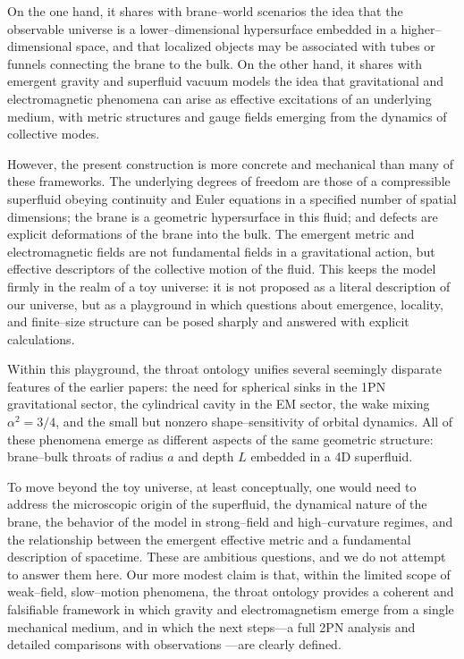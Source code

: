 \documentclass[12pt]{article}
\begin{document}
On the one hand, it shares with brane--world scenarios the idea that the
observable universe is a lower--dimensional hypersurface embedded in a
higher--dimensional space, and that localized objects may be associated with
tubes or funnels connecting the brane to the bulk.  On the other hand, it
shares with emergent gravity and superfluid vacuum models the idea that
gravitational and electromagnetic phenomena can arise as effective
excitations of an underlying medium, with metric structures and gauge fields
emerging from the dynamics of collective modes.

However, the present construction is more concrete and mechanical than many
of these frameworks.  The underlying degrees of freedom are those of a
compressible superfluid obeying continuity and Euler equations in a
specified number of spatial dimensions; the brane is a geometric hypersurface
in this fluid; and defects are explicit deformations of the brane into the
bulk.  The emergent metric and electromagnetic fields are not fundamental
fields in a gravitational action, but effective descriptors of the
collective motion of the fluid.  This keeps the model firmly in the realm
of a toy universe: it is not proposed as a literal description of our
universe, but as a playground in which questions about emergence, locality,
and finite--size structure can be posed sharply and answered with explicit
calculations.

Within this playground, the throat ontology unifies several seemingly
disparate features of the earlier papers: the need for spherical sinks in
the 1PN gravitational sector, the cylindrical cavity in the EM sector, the
wake mixing $\alpha^2=3/4$, and the small but nonzero
shape--sensitivity of orbital dynamics.  All of these phenomena emerge as
different aspects of the same geometric structure: brane--bulk throats of
radius $a$ and depth $L$ embedded in a 4D superfluid.

\medskip

To move beyond the toy universe, at least conceptually, one would need to
address the microscopic origin of the superfluid, the dynamical nature of
the brane, the behavior of the model in strong--field and high--curvature
regimes, and the relationship between the emergent effective metric and a
fundamental description of spacetime.  These are ambitious questions, and we
do not attempt to answer them here.  Our more modest claim is that, within
the limited scope of weak--field, slow--motion phenomena, the throat
ontology provides a coherent and falsifiable framework in which gravity and
electromagnetism emerge from a single mechanical medium, and in which the
next steps---a full 2PN analysis and detailed comparisons with observations
---are clearly defined.
\end{document}
